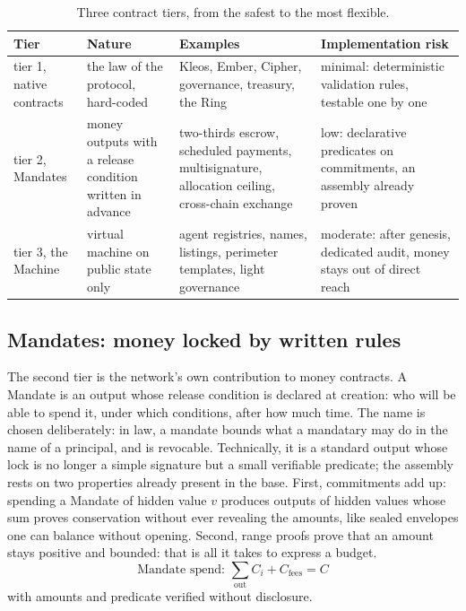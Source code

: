 \begin{table}[htbp]
\centering
\small
\caption{Three contract tiers, from the safest to the most flexible.}
\label{tab:tiers}
\begin{tabularx}{\textwidth}{@{}L{2.6cm}L{3.4cm}YY@{}}
\toprule
Tier & Nature & Examples & Implementation risk \\
\midrule
tier 1, native contracts & the law of the protocol, hard-coded & Kleos, Ember, Cipher, governance, treasury, the Ring & minimal: deterministic validation rules, testable one by one \\
tier 2, Mandates & money outputs with a release condition written in advance & two-thirds escrow, scheduled payments, multisignature, allocation ceiling, cross-chain exchange & low: declarative predicates on commitments, an assembly already proven \\
tier 3, the Machine & virtual machine on public state only & agent registries, names, listings, perimeter templates, light governance & moderate: after genesis, dedicated audit, money stays out of direct reach \\
\bottomrule
\end{tabularx}
\end{table}

\subsection{Mandates: money locked by written rules}

The second tier is the network's own contribution to money contracts. A
Mandate is an output whose release condition is declared at creation:
who will be able to spend it, under which conditions, after how much
time. The name is chosen deliberately: in law, a mandate bounds what a
mandatary may do in the name of a principal, and is revocable.
Technically, it is a standard output whose lock is no longer a simple
signature but a small verifiable predicate; the assembly rests on two
properties already present in the base. First, commitments add up:
spending a Mandate of hidden value $v$ produces outputs of hidden values
whose sum proves conservation without ever revealing the amounts, like
sealed envelopes one can balance without opening. Second, range proofs
prove that an amount stays positive and bounded: that is all it takes to
express a budget.
\begin{equation}\label{eq:mandate}
\text{Mandate spend: } \sum_{\mathrm{out}} C_i + C_{\mathrm{fees}} = C
\end{equation}
with amounts and predicate verified without disclosure.

